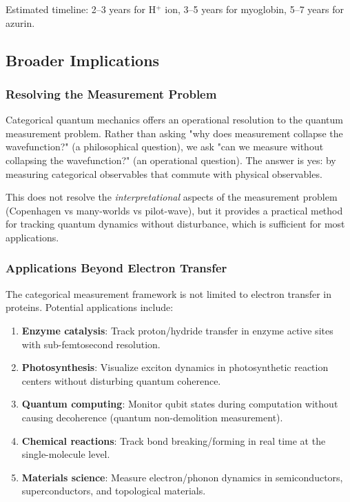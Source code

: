 \documentclass[twocolumn,10pt]{article}
\begin{document}
Estimated timeline: 2--3 years for H$^+$ ion, 3--5 years for myoglobin, 5--7 years 
for azurin.

\subsection{Broader Implications}

\subsubsection{Resolving the Measurement Problem}

Categorical quantum mechanics offers an operational resolution to the quantum 
measurement problem. Rather than asking "why does measurement collapse the 
wavefunction?" (a philosophical question), we ask "can we measure without 
collapsing the wavefunction?" (an operational question). The answer is yes: by 
measuring categorical observables that commute with physical observables.

This does not resolve the \textit{interpretational} aspects of the measurement 
problem (Copenhagen vs many-worlds vs pilot-wave), but it provides a practical 
method for tracking quantum dynamics without disturbance, which is sufficient 
for most applications.

\subsubsection{Applications Beyond Electron Transfer}

The categorical measurement framework is not limited to electron transfer in 
proteins. Potential applications include:
%
\begin{enumerate}
\item \textbf{Enzyme catalysis}: Track proton/hydride transfer in enzyme active 
sites with sub-femtosecond resolution.

\item \textbf{Photosynthesis}: Visualize exciton dynamics in photosynthetic 
reaction centers without disturbing quantum coherence.

\item \textbf{Quantum computing}: Monitor qubit states during computation without 
causing decoherence (quantum non-demolition measurement).

\item \textbf{Chemical reactions}: Track bond breaking/forming in real time at 
the single-molecule level.

\item \textbf{Materials science}: Measure electron/phonon dynamics in 
semiconductors, superconductors, and topological materials.
\end{enumerate}
\end{document}
